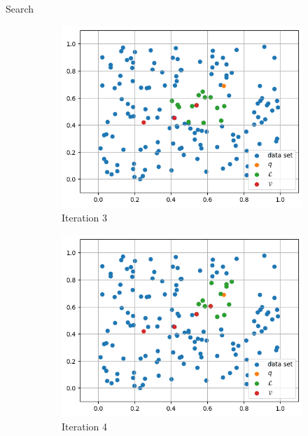 \begin{frame}{Search}
    \begin{figure}[h]
        \centering
        \hfill
        \begin{subfigure}{0.31\textwidth}
            \includegraphics[width=\textwidth]{images/greedy-search-3}
            \caption{Iteration 3}
        \end{subfigure}
        \hfill
        \begin{subfigure}{0.31\textwidth}
            \includegraphics[width=\textwidth]{images/greedy-search-4}
            \caption{Iteration 4}
        \end{subfigure}
        \hfill
        \begin{subfigure}{0.31\textwidth}

\end{subfigure}
\end{figure}
\end{frame}
